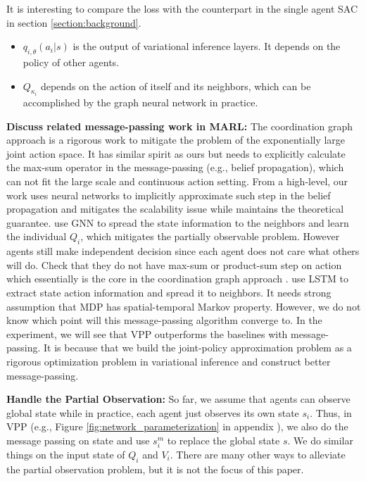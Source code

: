\documentclass[11pt,a4paper]{article}
\theoremstyle{definition}
\begin{document}
It is interesting to compare the loss  with the counterpart in the single agent SAC in section \ref{section:background}. 
\begin{itemize}[leftmargin=*,nolistsep,nosep]
	\item $q_{i,\theta}(a_i|s)$ is the output of variational inference layers. It depends on the policy of other agents.
	\item $Q_{\kappa_i}$ depends on the action of itself and its neighbors, which can be accomplished by the graph neural network in practice. \\
\end{itemize}
\vspace{-2mm}

\textbf{Discuss related message-passing work in MARL:}
The coordination graph approach  \citep{bohmer2019deep} is a rigorous work to mitigate the problem of the exponentially large joint action space. It has similar spirit as ours but needs to explicitly calculate the max-sum operator in the message-passing (e.g., belief propagation), which can not fit the large scale and continuous action setting. From a high-level, our work uses neural networks to implicitly approximate such step in the belief propagation and mitigates the scalability issue while maintains the theoretical guarantee. \citet{jiang2020graph} use GNN to spread the state information to the neighbors and learn the individual $Q_i$, which mitigates the partially observable problem. However agents still make independent decision since each agent does not care what others will do. Check that they do not have max-sum or product-sum step on action which  essentially is the core in the coordination graph approach \citep{bohmer2019deep}.  \citet{chu2020multi}  use LSTM to extract state action information and spread it to neighbors. It needs strong assumption that MDP has spatial-temporal Markov property. However, we do not know which point will this message-passing algorithm converge to.  In the experiment, we will see that VPP outperforms the baselines with message-passing. It is because that we build the joint-policy approximation problem as a rigorous optimization problem in variational inference and  construct better message-passing. 


\textbf{Handle the Partial Observation:}
So far, we assume that agents can observe global state while in practice, each agent just observes its own state $s_i$. Thus, in VPP (e.g., Figure \ref{fig:network_parameterization} in appendix ), we also do the message passing on state and use $ s_i^{m}$ to replace the global state $s$. We do similar things on the input state of $Q_i$ and $V_i$. There are many other ways to alleviate the partial observation problem, but it is not the focus of this paper.
\end{document}
